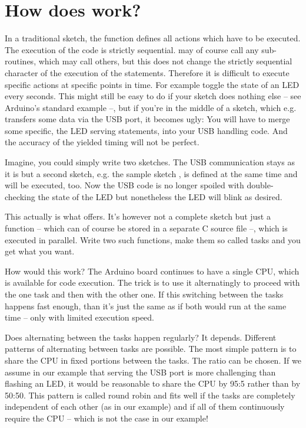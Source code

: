 \chapter{How does \rtos{} work?}
\label{secHowDoesRTuinOSWork}

In a traditional sketch, the function  defines all actions
which have to be executed. The execution of the code is strictly
sequential.  may of course call any sub-routines, which may
call others, but this does not change the strictly sequential character of
the execution of the statements. Therefore it is difficult to execute
specific actions at specific points in time. For example toggle the state
of an LED every seconds. This might still be easy to do if your sketch does
nothing else -- see Arduino's standard example  --, but if
you're in the middle of a sketch, which e.g. transfers some data via the
USB port, it becomes ugly: You will have to merge some specific, the LED
serving statements, into your USB handling code. And the accuracy of the
yielded timing will not be perfect.

Imagine, you could simply write two sketches. The USB communication stays
as it is but a second sketch, e.g. the sample sketch , is
defined at the same time and will be executed, too. Now the USB code is no
longer spoiled with double-checking the state of the LED but nonetheless
the LED will blink as desired.

This actually is what \rtos{} offers. It's however not a complete sketch
but just a function -- which can of course be stored in a separate C
source file --, which is executed in parallel. Write two such functions,
make them so called tasks and you get what you want.

How would this work? The Arduino board continues to have a single CPU,
which is available for code execution. The trick is to use it
alternatingly to proceed with the one task and then with the other one. If
this switching between the tasks happens fast enough, than it's just the
same as if both would run at the same time -- only with limited execution
speed.

Does alternating between the tasks happen regularly? It depends. Different
patterns of alternating between tasks are possible. The most simple
pattern is to share the CPU in fixed portions between the tasks. The ratio
can be chosen. If we assume in our example that serving the USB port is
more challenging than flashing an LED, it would be reasonable to share the
CPU by 95:5 rather than by 50:50. This pattern is called round robin and
fits well if the tasks are completely independent of each other (as in our
example) and if all of them continuously require the CPU -- which is not
the case in our example!

